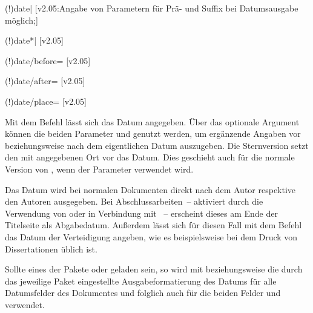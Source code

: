 \begin{DeclareEntity*}{}
\begin{DeclareEntity*}{}
\begin{DeclareEntity*}{}
\begin{Declaration}
  {\Macro(!){date|}}
  [v2.05:Angabe von Parametern für Prä- und Suffix bei Datumsausgabe möglich;]
\begin{Declaration}
  {\Macro(!){date*|}}
  [v2.05]
\begin{Declaration}
  {\Macro(!){date/before=}}
  [v2.05]
\begin{Declaration}
  {\Macro(!){date/after=}}
  [v2.05]
\begin{Declaration}
  {\Macro(!){date/place=}}
  [v2.05]
\begin{Declaration}
  {}
Mit dem Befehl  lässt sich das Datum angegeben. 
%
Über das optionale Argument können die beiden Parameter  und 
 genutzt werden, um ergänzende Angaben vor beziehungsweise 
nach dem eigentlichen Datum auszugeben. Die Sternversion  setzt 
den mit  angegebenen Ort vor das Datum. Dies geschieht auch für 
die normale Version von , wenn der Parameter  
verwendet wird.

Das Datum wird bei normalen Dokumenten direkt nach dem Autor respektive den 
Autoren ausgegeben. Bei Abschlussarbeiten~-- aktiviert durch die Verwendung von 
 oder  in Verbindung mit ~-- 
erscheint dieses am Ende der Titelseite als Abgabedatum. Außerdem lässt sich 
für diesen Fall mit dem Befehl  das Datum der Verteidigung 
angeben, wie es beispielsweise bei dem Druck von Dissertationen üblich ist.

Sollte eines der Pakete  oder  geladen 
sein, so wird mit  beziehungsweise  die durch 
das jeweilige Paket eingestellte Ausgabeformatierung des Datums für alle 
Datumsfelder des Dokumentes und folglich auch für die beiden Felder 
 und  verwendet.
\end{Declaration}
\end{Declaration}
\end{Declaration}
\end{Declaration}
\end{Declaration}
\end{Declaration}


\end{DeclareEntity*}
\end{DeclareEntity*}
\end{DeclareEntity*}
